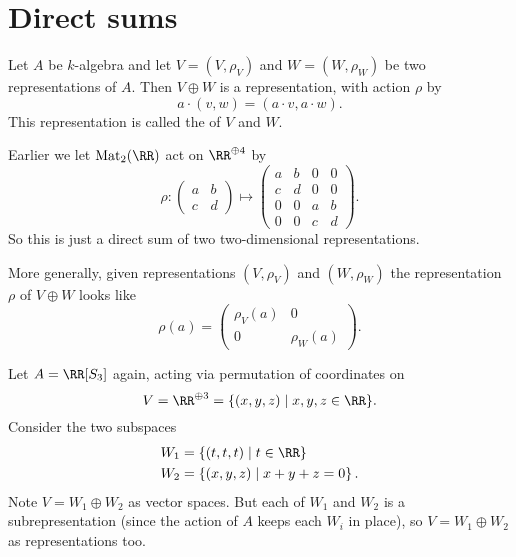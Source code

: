 \section{Direct sums}
\begin{definition}
	Let $A$ be $k$-algebra and let $V = (V, \rho_V)$ and $W = (W, \rho_W)$
	be two representations of $A$.
	Then $V \oplus W$ is a representation, with action $\rho$ by
	\[ a \cdot (v,w) = (a \cdot v, a \cdot w). \]
	This representation is called the  of $V$ and $W$.
\end{definition}
\begin{example}
	Earlier we let $\Mat_2(\RR)$ act on $\RR^{\oplus 4}$ by
	\[
		\rho : 
		\begin{pmatrix} a & b \\ c & d \end{pmatrix} 
		\mapsto
		\begin{pmatrix} a & b & 0 & 0 \\ c & d & 0 & 0 \\
			0 & 0 & a & b \\ 0 & 0 & c & d \end{pmatrix} .
	\]
	So this is just a direct sum of two two-dimensional representations.
\end{example}
More generally, given representations $(V, \rho_V)$ and $(W, \rho_W)$
the representation $\rho$ of $V \oplus W$ looks like
\[ \rho(a) =
	\begin{pmatrix}
		\rho_V(a) & 0 \\ 0 & \rho_W(a)
	\end{pmatrix}.
\]
\begin{example}
	Let $A = \RR[S_3]$ again,
	acting via permutation of coordinates on
	\[ V = \RR^{\oplus 3} = \{ (x,y,z) \mid x,y,z \in \RR \}. \]
	Consider the two subspaces
	\begin{align*}
		W_1 &= \left\{ (t,t,t) \mid t \in \RR \right\} \\
		W_2 &= \left\{ (x,y,z) \mid x+y+z = 0 \right\}.
	\end{align*}
	Note $V = W_1 \oplus W_2$ as vector spaces.
	But each of $W_1$ and $W_2$ is a subrepresentation
	(since the action of $A$ keeps each $W_i$ in place),
	so $V = W_1 \oplus W_2$ as representations too.
\end{example}

